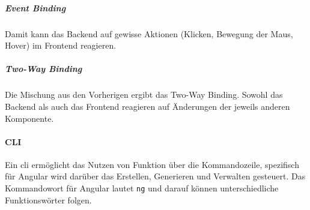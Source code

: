 \subparagraph{Event Binding} Damit kann das Backend auf gewisse Aktionen (Klicken, Bewegung der Maus, Hover) im Frontend reagieren.

\subparagraph{Two-Way Binding} Die Mischung aus den Vorherigen ergibt das Two-Way Binding. Sowohl das Backend als auch das Frontend reagieren auf Änderungen der jeweils anderen Komponente.

\paragraph{CLI}

Ein \gls{cli} ermöglicht das Nutzen von Funktion über die Kommandozeile, spezifisch für Angular wird darüber das Erstellen, Generieren und Verwalten gesteuert. Das Kommandowort für Angular lautet \lstinline{ng} und darauf können unterschiedliche Funktionswörter folgen.